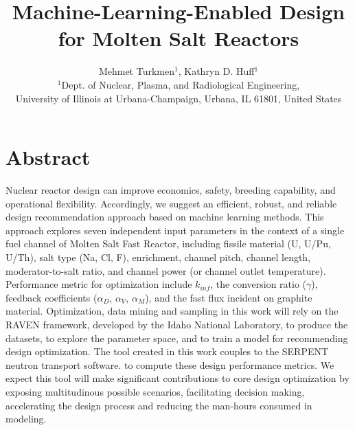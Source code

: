\documentclass[10pt,a4paper]{article}
\begin{document}
\title{Machine-Learning-Enabled Design for Molten Salt Reactors}
\author{Mehmet Turkmen$^1$, Kathryn D. Huff$^1$\\
$^1$Dept. of Nuclear, Plasma, and Radiological Engineering, \\University of Illinois at Urbana-Champaign, Urbana, IL 61801, United States}

\maketitle


\section*{Abstract}
Nuclear reactor design can improve economics, safety, breeding capability, and 
operational flexibility. 
Accordingly, we suggest an efficient, robust, and reliable design recommendation 
approach based on machine learning methods.
This approach explores seven independent input parameters
in the context of a  single fuel channel of Molten Salt Fast Reactor, including 
fissile material (U, U/Pu, U/Th), salt type (Na, Cl, F), enrichment, channel 
pitch, channel length,
moderator-to-salt ratio, and channel power (or channel outlet temperature). 
Performance metric for optimization include 
$k_{inf}$, the conversion ratio ($\gamma$), feedback coefficients ($\alpha_D$, 
$\alpha_{V}$, $\alpha_{M}$), and the fast flux incident on graphite material.
Optimization, data mining and sampling in this work will rely on the RAVEN 
framework, developed by the Idaho National Laboratory, to produce the datasets, 
to explore the parameter space, and to train a model for recommending design 
optimization. The tool created in this work couples to the SERPENT neutron transport software.  
to compute these design performance metrics. We expect this tool will make
significant contributions to core design optimization by exposing multitudinous 
possible scenarios, facilitating decision making, accelerating the design 
process and reducing the man-hours consumed in modeling.
\end{document}
